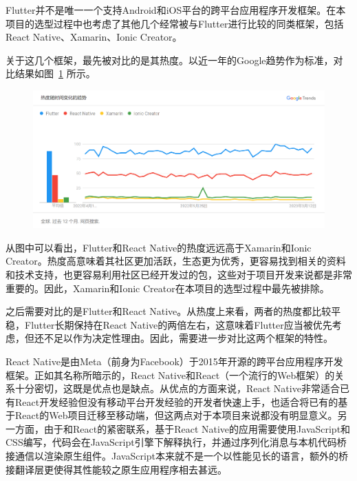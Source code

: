 Flutter并不是唯一一个支持Android和iOS平台的跨平台应用程序开发框架。在本项目的选型过程中也考虑了其他几个经常被与Flutter进行比较的同类框架，包括React Native\cite{ReactNativeLearn}、Xamarin\cite{XamarinOpensourceMobile}、Ionic Creator\cite{IonicFrameworkCrossPlatform}。

关于这几个框架，最先被对比的是其热度。以近一年的Google趋势作为标准，对比结果如图~\ref{fig:google-trends} 所示。

\begin{figure}[h]
    \centering
    \includegraphics[width=\textwidth]{../assets/google-trends}
    \label{fig:google-trends}
\end{figure}

从图中可以看出，Flutter和React Native的热度远远高于Xamarin和Ionic Creator。热度高意味着其社区更加活跃，生态更为优秀，更容易找到相关的资料和技术支持，也更容易利用社区已经开发过的包，这些对于项目开发来说都是非常重要的。因此，Xamarin和Ionic Creator在本项目的选型过程中最先被排除。

之后需要对比的是Flutter和React Native。从热度上来看，两者的热度都比较平稳，Flutter长期保持在React Native的两倍左右，这意味着Flutter应当被优先考虑，但还不足以作为决定性理由。因此，需要进一步对比这两个框架的特性。

React Native是由Meta（前身为Facebook）于2015年开源的跨平台应用程序开发框架。正如其名称所暗示的，React Native和React（一个流行的Web框架）的关系十分密切，这既是优点也是缺点。从优点的方面来说，React Native非常适合已有React开发经验但没有移动平台开发经验的开发者快速上手，也适合将已有的基于React的Web项目迁移至移动端，但这两点对于本项目来说都没有明显意义。另一方面，由于和React的紧密联系，基于React Native的应用需要使用JavaScript和CSS编写，代码会在JavaScript引擎下解释执行，并通过序列化消息与本机代码桥接通信以渲染原生组件。JavaScript本来就不是一个以性能见长的语言，额外的桥接翻译层更使得其性能较之原生应用程序相去甚远。

